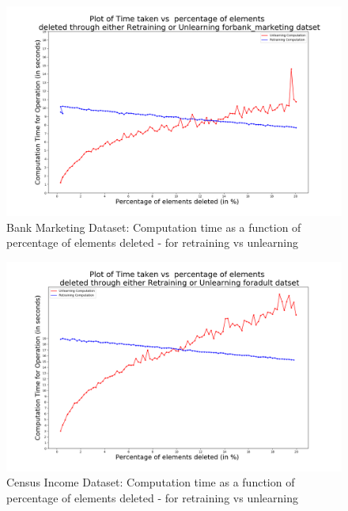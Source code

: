 \documentclass[11pt,letterpaper]{article}
\begin{document}
\begin{figure}[h]
    \centering
    \includegraphics[width=6.5 in]{tables/PlotUnlearningVsRetrainingbank_marketing.png}
    \caption{Bank Marketing Dataset: Computation time as a function of percentage of elements deleted - for retraining vs unlearning}
    \label{fig:graph-bankmarketing}
\end{figure}

\begin{figure}[h]
    \centering
    \includegraphics[width=6.5 in]{tables/PlotUnlearningVsRetrainingadult.png}
    \caption{Census Income Dataset: Computation time as a function of percentage of elements deleted - for retraining vs unlearning}
    \label{fig:graph-censusincome}
\end{figure}
\end{document}
